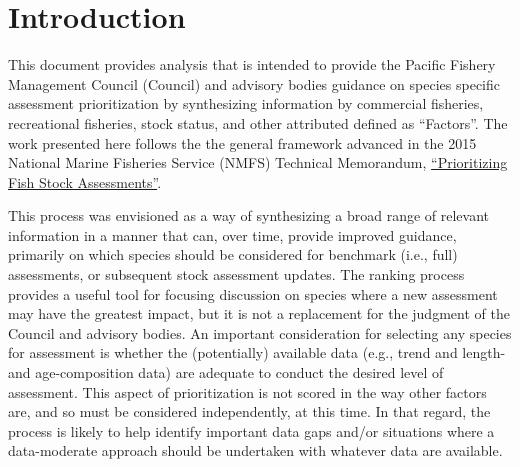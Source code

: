 \documentclass[11pt,
  english,
  a4paper,
]{article}
\begin{document}
\newcommand{\lt}{\ensuremath <}
\newcommand{\gt}{\ensuremath >}

\pagebreak
{}
\setcounter{page}{1}

\renewcommand{\thetable}{\roman{table}}
\renewcommand{\thefigure}{\roman{figure}}

\setlength\parskip{0.5em plus 0.1em minus 0.2em}

\pagebreak
\setlength{\parskip}{5mm plus1mm minus1mm}
\setcounter{page}{1}
\renewcommand{\thefigure}{\arabic{figure}}
\renewcommand{\thetable}{\arabic{table}}
\setcounter{table}{0}
\setcounter{figure}{0}

\setlength\parskip{0.5em plus 0.1em minus 0.2em}


\hypertarget{introduction}{%
\section{Introduction}\label{introduction}}

\leavevmode\tagmcend\tagstructend


This document provides analysis that is intended to provide the Pacific Fishery Management Council (Council) and advisory bodies guidance on species specific assessment prioritization by synthesizing information by commercial fisheries, recreational fisheries, stock status, and other attributed defined as ``Factors''. The work presented here follows the the general framework advanced in the 2015 National Marine Fisheries Service (NMFS) Technical Memorandum, {\href{https://www.st.nmfs.noaa.gov/Assets/stock/documents/PrioritizingFishStockAssessments_FinalWeb.pdf}{``Prioritizing Fish Stock Assessments''}\leavevmode\tagmcend\tagstructend}.

\leavevmode\tagmcend\tagstructend\par


This process was envisioned as a way of synthesizing a broad range of relevant information in a manner that can, over time, provide improved guidance, primarily on which species should be considered for benchmark (i.e., full) assessments, or subsequent stock assessment updates. The ranking process provides a useful tool for focusing discussion on species where a new assessment may have the greatest impact, but it is not a replacement for the judgment of the Council and advisory bodies. An important consideration for selecting any species for assessment is whether the (potentially) available data (e.g., trend and length- and age-composition data) are adequate to conduct the desired level of assessment. This aspect of prioritization is not scored in the way other factors are, and so must be considered independently, at this time. In that regard, the process is likely to help identify important data gaps and/or situations where a data-moderate approach should be undertaken with whatever data are available.
\end{document}
